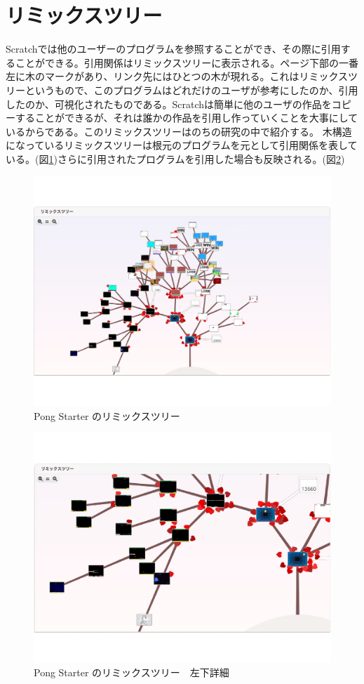 \documentclass[a4paper,10pt,onecolumn,oneside,openany]{jsbook}
\begin{document}
\section{リミックスツリー}
Scratchでは他のユーザーのプログラムを参照することができ、その際に引用することができる。引用関係はリミックスツリーに表示される。ページ下部の一番左に木のマークがあり、リンク先にはひとつの木が現れる。これはリミックスツリーというもので、このプログラムはどれだけのユーザが参考にしたのか、引用したのか、可視化されたものである。Scratchは簡単に他のユーザの作品をコピーすることができるが、それは誰かの作品を引用し作っていくことを大事にしているからである。このリミックスツリーはのちの研究の中で紹介する。
木構造になっているリミックスツリーは根元のプログラムを元として引用関係を表している。(図\ref{psrt})さらに引用されたプログラムを引用した場合も反映される。(図\ref{rtdit})

\begin{figure}[ht]
  \centering
    \includegraphics[scale=0.5]{graphic/remixtree_all.pdf}
  \caption{Pong Starter のリミックスツリー}
  \label{psrt}
 \end{figure}

\begin{figure}[hb]
  \centering
    \includegraphics[scale=0.5]{graphic/remixtree_detail.pdf}
  \caption{Pong Starter のリミックスツリー　左下詳細}
  \label{rtdit}
 \end{figure}
\end{document}
